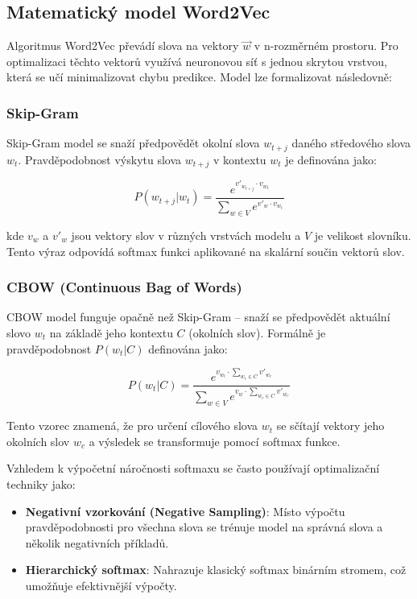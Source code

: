 \documentclass[czech, ba, kiv, he]{fasthesis}
\begin{document}
\subsection{Matematický model Word2Vec}  

Algoritmus Word2Vec převádí slova na vektory \( \vec{w} \) v n-rozměrném prostoru. Pro optimalizaci těchto vektorů využívá neuronovou síť s jednou skrytou vrstvou, která se učí minimalizovat chybu predikce. Model lze formalizovat následovně:  

\subsubsection{Skip-Gram}  

Skip-Gram model se snaží předpovědět okolní slova \( w_{t+j} \) daného středového slova \( w_t \). Pravděpodobnost výskytu slova \( w_{t+j} \) v kontextu \( w_t \) je definována jako:  

\begin{equation}  
P(w_{t+j} | w_t) = \frac{e^{v'_{w_{t+j}} \cdot v_{w_t}}}{\sum_{w \in V} e^{v'_w \cdot v_{w_t}}}  
\end{equation}  

kde \( v_w \) a \( v'_w \) jsou vektory slov v různých vrstvách modelu a \( V \) je velikost slovníku. Tento výraz odpovídá softmax funkci aplikované na skalární součin vektorů slov.  

\subsubsection{CBOW (Continuous Bag of Words)}  

CBOW model funguje opačně než Skip-Gram – snaží se předpovědět aktuální slovo \( w_t \) na základě jeho kontextu \( C \) (okolních slov). Formálně je pravděpodobnost \( P(w_t | C) \) definována jako:  

\begin{equation}  
P(w_t | C) = \frac{e^{v_{w_t} \cdot \sum_{w_c \in C} v'_{w_c}}}{\sum_{w \in V} e^{v_w \cdot \sum_{w_c \in C} v'_{w_c}}}  
\end{equation}  

Tento vzorec znamená, že pro určení cílového slova \( w_t \) se sčítají vektory jeho okolních slov \( w_c \) a výsledek se transformuje pomocí softmax funkce.  

Vzhledem k výpočetní náročnosti softmaxu se často používají optimalizační techniky jako:  

\begin{itemize}  
    \item \textbf{Negativní vzorkování (Negative Sampling)}: Místo výpočtu pravděpodobnosti pro všechna slova se trénuje model na správná slova a několik negativních příkladů.  
    \item \textbf{Hierarchický softmax}: Nahrazuje klasický softmax binárním stromem, což umožňuje efektivnější výpočty.  
\end{itemize}  
\end{document}
